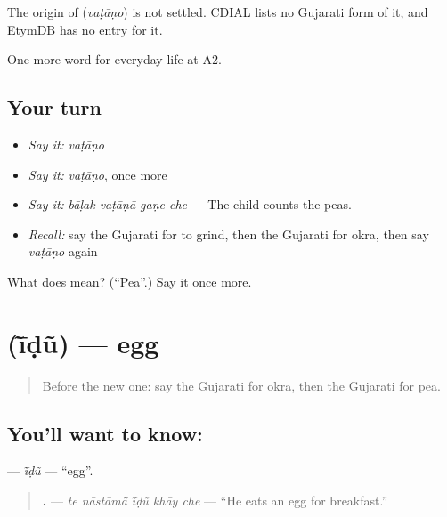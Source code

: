 \begin{cousinweb}
The origin of \textbf{} (\emph{vaṭāṇo}) is not settled. CDIAL lists no Gujarati form of it, and EtymDB has no entry for it.
\end{cousinweb}

\begin{grammarlens}[title={What you've built}]
One more word for everyday life at A2.
\end{grammarlens}

\subsection*{Your turn}
\begin{itemize}
\raggedright
  \item \emph{Say it:} \emph{vaṭāṇo}
  \item \emph{Say it:} \emph{vaṭāṇo}, once more
  \item \emph{Say it:} \emph{bāḷak vaṭāṇā gaṇe che} — The child counts the peas.
  \item \emph{Recall:} say the Gujarati for to grind, then the Gujarati for okra, then say \emph{vaṭāṇo} again
\end{itemize}

\begin{tcolorbox}[breakable,colback=teal!4,colframe=teal!35!black,title={Before you move on}]
What does  mean? (\textquotedblleft{}Pea\textquotedblright{}.) Say it once more.
\end{tcolorbox}
\section[\texorpdfstring{\gu{ઈંડું} (ī̃ḍũ)}{ઈંડું (ī̃ḍũ)}]{ (ī̃ḍũ) — egg}

\label{lesson:GU-C167-idu}



\begin{quote}
Before the new one: say the Gujarati for okra, then the Gujarati for pea.
\end{quote}

\subsection*{You'll want to know: }
\textbf{} — \emph{ī̃ḍũ} — \textquotedblleft{}egg\textquotedblright{}.

\begin{quote}
\textbf{    .} — \emph{te nāstāmā̃ ī̃ḍũ khāy che} — \textquotedblleft{}He eats an egg for breakfast.\textquotedblright{}
\end{quote}


